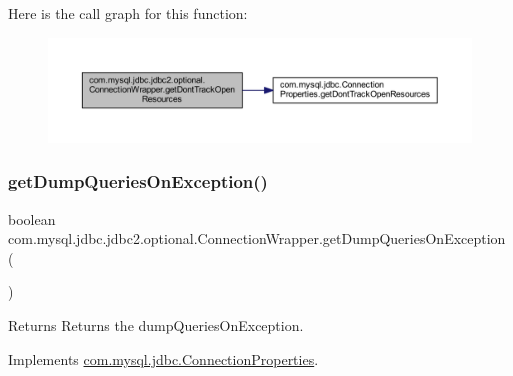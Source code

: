 Here is the call graph for this function\+:
\nopagebreak
\begin{figure}[H]
\begin{center}
\leavevmode
\includegraphics[width=350pt]{classcom_1_1mysql_1_1jdbc_1_1jdbc2_1_1optional_1_1_connection_wrapper_a8d9246e6e3a72c4ecfeca155225eafa9_cgraph}
\end{center}
\end{figure}
\mbox{\label{classcom_1_1mysql_1_1jdbc_1_1jdbc2_1_1optional_1_1_connection_wrapper_a21a6730d44ced20d8242a8adaae34364}} 
\subsubsection{\texorpdfstring{get\+Dump\+Queries\+On\+Exception()}{getDumpQueriesOnException()}}
{\footnotesize\ttfamily boolean com.\+mysql.\+jdbc.\+jdbc2.\+optional.\+Connection\+Wrapper.\+get\+Dump\+Queries\+On\+Exception (\begin{DoxyParamCaption}{ }\end{DoxyParamCaption})}

\begin{DoxyReturn}{Returns}
Returns the dump\+Queries\+On\+Exception. 
\end{DoxyReturn}


Implements \mbox{\hyperlink{interfacecom_1_1mysql_1_1jdbc_1_1_connection_properties_a582cd7a28b4d507bf0e3ceaae3680763}{com.\+mysql.\+jdbc.\+Connection\+Properties}}.

